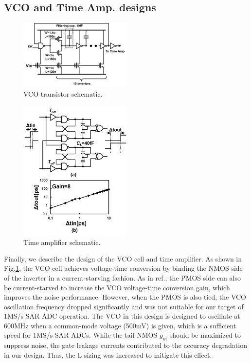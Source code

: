 \documentclass[journal]{IEEEtran}
\begin{document}
\subsection{VCO and Time Amp. designs}
\begin{figure}[!]
\centering
 \includegraphics[width=0.5\textwidth]{figs/vco_cell.png}
  \caption{VCO transistor schematic.}
  \label{cell}
\end{figure}

\begin{figure}[!]
\centering
 \includegraphics[width=0.5\textwidth]{figs/ta_chara.png}
  \caption{Time amplifier schematic.}
  \label{timeamp}
\end{figure}

Finally, we describe the design of the VCO cell and time amplifier. As shown in Fig.\ref{cell}, the VCO cell achieves voltage-time conversion by binding the NMOS side of the inverter in a current-starving fashion. As in ref.\cite{timecomp}, the PMOS side can also be current-starved to increase the VCO voltage-time conversion gain, which improves the noise performance. However, when the PMOS is also tied, the VCO oscillation frequency dropped significantly and was not suitable for our target of 1MS/s SAR ADC operation. The VCO in this design is designed to oscillate at 600MHz when a common-mode voltage (500mV) is given, which is a sufficient speed for 1MS/s SAR ADCs. While the tail NMOS $g_m$ should be maximized to suppress noise, the gate leakage currents contributed to the accuracy degradation in our design. Thus, the L sizing was increased to mitigate this effect. 
\end{document}
